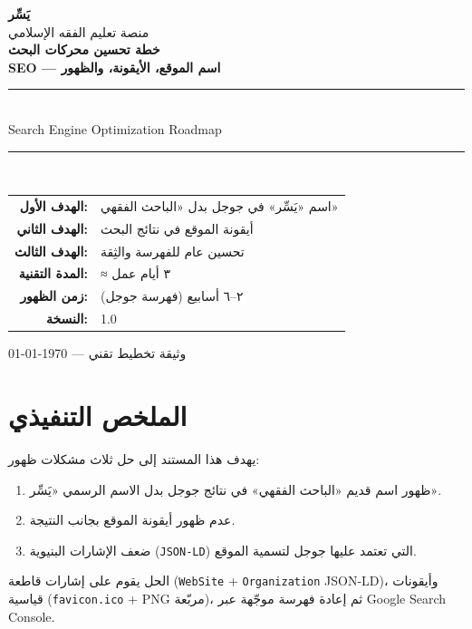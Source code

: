 \documentclass[11pt]{article}
\newcommand{\code}[1]{\textcolor{darkbg}{\texttt{\small #1}}}
\begin{document}
\begin{titlepage}
\centering
\vspace*{2.5cm}
{\Huge\bfseries\color{gold} يَسِّر}\\[0.4cm]
{\large\color{midgray} منصة تعليم الفقه الإسلامي}\\[2.5cm]

{\Huge\bfseries خطة تحسين محركات البحث}\\[0.8cm]
{\LARGE\bfseries SEO — اسم الموقع، الأيقونة، والظهور}\\[1.2cm]

\rule{0.7\textwidth}{0.5pt}\\[0.8cm]
{\large Search Engine Optimization Roadmap}\\[0.8cm]
\rule{0.7\textwidth}{0.5pt}\\[2.5cm]

\begin{tabular}{r l}
\textbf{الهدف الأول:}   & اسم «يَسِّر» في جوجل بدل «الباحث الفقهي» \\
\textbf{الهدف الثاني:}  & أيقونة الموقع في نتائج البحث \\
\textbf{الهدف الثالث:}  & تحسين عام للفهرسة والثِقة \\
\textbf{المدة التقنية:} & ≈ ٣ أيام عمل \\
\textbf{زمن الظهور:}    & ٢–٦ أسابيع (فهرسة جوجل) \\
\textbf{النسخة:}        & 1.0 \\
\end{tabular}

\vfill
{\small\color{midgray} وثيقة تخطيط تقني — \today}
\end{titlepage}

\newpage
\tableofcontents
\newpage

\section{الملخص التنفيذي}

\begin{infobox}
يهدف هذا المستند إلى حل ثلاث مشكلات ظهور:
\begin{enumerate}
\item ظهور اسم قديم «الباحث الفقهي» في نتائج جوجل بدل الاسم الرسمي «يَسِّر».
\item عدم ظهور أيقونة الموقع بجانب النتيجة.
\item ضعف الإشارات البنيوية (\code{JSON-LD}) التي تعتمد عليها جوجل لتسمية الموقع.
\end{enumerate}
الحل يقوم على إشارات قاطعة (\code{WebSite} + \code{Organization} JSON-LD)، وأيقونات قياسية (\code{favicon.ico} + PNG مربّعة)، ثم إعادة فهرسة موجّهة عبر Google Search Console.
\end{infobox}
\end{document}
